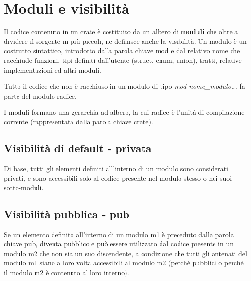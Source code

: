 


\section{Moduli e visibilità}

Il codice contenuto in un crate è costituito da un albero di \textbf{moduli} che
oltre a dividere il sorgente in più piccoli, ne definisce anche la visibilità.
Un modulo è un costrutto sintattico, introdotto dalla parola chiave mod e dal
relativo nome che racchiude funzioni, tipi definiti dall'utente (struct, enum,
union), tratti, relative implementazioni ed altri moduli.

Tutto il codice che non è racchiuso in un modulo di tipo \textit{mod nome\_modulo{...}}
fa parte del modulo radice.

I moduli formano una gerarchia ad albero, la cui radice è l'unità di
compilazione corrente (rappresentata dalla parola chiave crate).

\subsection{Visibilità di default - privata}
Di base, tutti gli elementi definiti all'interno di un modulo sono considerati
privati, e sono accessibili solo al codice presente nel modulo stesso o nei suoi
sotto-moduli.

\subsection{Visibilità pubblica - pub}
Se un elemento definito all'interno di un modulo m1 è preceduto dalla parola
chiave pub, diventa pubblico e può essere utilizzato dal codice presente in un
modulo m2 che non sia un suo discendente, a condizione che tutti gli
antenati del modulo m1 siano a loro volta accessibili al modulo m2
(perché pubblici o perchè il modulo m2 è contenuto al loro interno).



